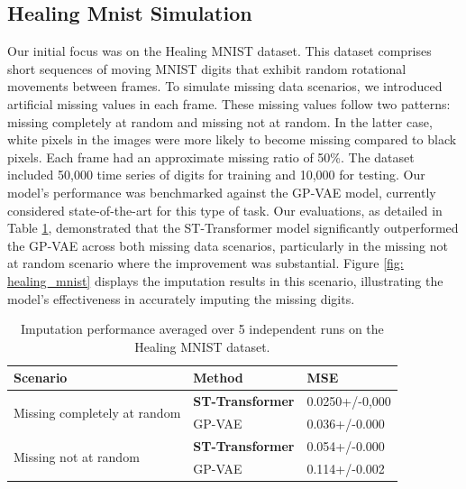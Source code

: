 \documentclass[11pt]{article}
\begin{document}
\subsection{Healing Mnist Simulation}
Our initial focus was on the Healing MNIST dataset. This dataset comprises short sequences of moving MNIST digits that exhibit random rotational movements between frames. To simulate missing data scenarios, we introduced artificial missing values in each frame. These missing values follow two patterns: missing completely at random and missing not at random. In the latter case, white pixels in the images were more likely to become missing compared to black pixels. Each frame had an approximate missing ratio of 50\%. The dataset included 50,000 time series of digits for training and 10,000 for testing. Our model's performance was benchmarked against the GP-VAE model, currently considered state-of-the-art for this type of task. Our evaluations, as detailed in Table \ref{tab: healing_mnist}, demonstrated that the ST-Transformer model significantly outperformed the GP-VAE across both missing data scenarios, particularly in the missing not at random scenario where the improvement was substantial. Figure \ref{fig: healing_mnist} displays the imputation results in this scenario, illustrating the model's effectiveness in accurately imputing the missing digits.




\begin{table}[h!]
    \centering
    \begin{tabularx}{\textwidth}{XXX}
        \toprule
        Scenario&Method & MSE \\
        \midrule
        \multirow{2}{*}{Missing completely at random}&\textbf{ST-Transformer} & 0.0250+/-0,000   \\

        &GP-VAE& 0.036+/-0.000\\
       
        \midrule
          \multirow{2}{*}{Missing not at random}&\textbf{ST-Transformer} & 0.054+/-0.000  \\
        &GP-VAE&0.114+/-0.002\\
        \bottomrule

        
    \end{tabularx}
    \caption{Imputation performance averaged over 5 independent runs on the Healing MNIST dataset.}
    \label{tab: healing_mnist}
\end{table}
\end{document}
